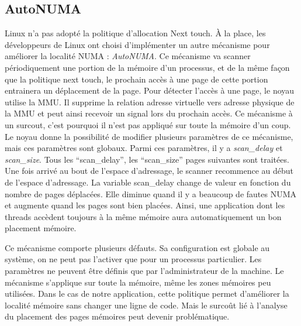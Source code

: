 \subsection{AutoNUMA}
\label{sec:autonuma}
Linux n'a pas adopté la politique d'allocation Next touch.
\`A la place, les développeurs de Linux ont choisi d'implémenter un autre mécanisme pour améliorer la localité NUMA : {\em AutoNUMA}.
Ce mécanisme va scanner périodiquement une portion de la mémoire d'un processus, et de la même façon que la politique next touch, le prochain accès à une page de cette portion entrainera un déplacement de la page.
%
Pour détecter l'accès à une page, le noyau utilise la MMU.
%
Il supprime la relation adresse virtuelle vers adresse physique de la MMU et peut ainsi recevoir un signal lors du prochain accès.
%
Ce mécanisme à un surcout, c'est pourquoi il n'est pas appliqué sur toute la mémoire d'un coup.
%
Le noyau donne la possibilité de modifier plusieurs paramètres de ce mécanisme, mais ces paramètres sont globaux.
%
Parmi ces paramètres, il y a {\em scan\_delay} et {\em scan\_size}.
%
Tous les ``scan\_delay'', les ``scan\_size'' pages suivantes sont traitées.
%
Une fois arrivé au bout de l'espace d'adressage, le scanner recommence au début de l'espace d'adressage.
%
La variable scan\_delay change de valeur en fonction du nombre de pages déplacées.
%
Elle diminue quand il y a beaucoup de fautes NUMA et augmente quand les pages sont bien placées.
%
Ainsi, une application dont les threads accèdent toujours à la même mémoire aura automatiquement un bon placement mémoire.

Ce mécanisme comporte plusieurs défauts.
%
Sa configuration est globale au système, on ne peut pas l'activer que pour un processus particulier.
%
Les paramètres ne peuvent être définis que par l'administrateur de la machine.
%
Le mécanisme s'applique sur toute la mémoire, même les zones mémoires peu utilisées.
%
Dans le cas de notre application, cette politique permet d'améliorer la localité mémoire sans changer une ligne de code.
%
Mais le surcoût lié à l'analyse du placement des pages mémoires peut devenir problématique.
